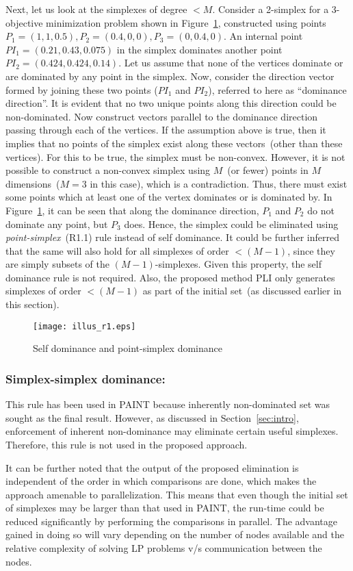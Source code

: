 {	Next, let us look at the simplexes of degree $<M$. Consider a 2-simplex for a 3-objective minimization problem shown in Figure~\ref{fig:illus_r1}, constructed using points $P_1=(1,1,0.5),P_2=(0.4,0,0),P_3=(0,0.4,0)$. An internal point $PI_1=(0.21,0.43,0.075)$ in the simplex dominates another point $PI_2=(0.424,0.424,0.14)$. Let us assume that none of the vertices dominate or are dominated by any point in the simplex. Now, consider the direction vector formed by joining these two points ($PI_1$ and $PI_2$), referred to here as ``dominance direction''. It is evident that no two unique points along this direction could be non-dominated. Now construct vectors parallel to the dominance direction passing through each of the vertices. If the assumption above is true, then it implies that no points of the simplex exist along these vectors~(other than these vertices). For this to be true, the simplex must be non-convex. However, it is not possible to construct a non-convex simplex using $M$~(or fewer) points in $M$ dimensions~($M=3$ in this case), which is a contradiction. Thus, there must exist some points which at least one of the vertex dominates or is dominated by. In Figure~\ref{fig:illus_r1}, it can be seen that along the dominance direction, $P_1$ and $P_2$ do not dominate any point, but $P_3$ does. Hence, the simplex could be eliminated using \textit{point-simplex}~(R1.1) rule instead of self dominance. It could be further inferred that the same will also hold for all simplexes of order $<(M-1)$, since they are simply subsets of the $(M-1)$-simplexes. Given this property, the self dominance rule is not required. Also, the proposed method PLI only generates simplexes of order $<(M-1)$ as part of the initial set~(as discussed earlier in this section).
	
	\begin{figure}[!htb]
		\centering
		\texttt{[image: illus\_r1.eps]} \vspace{1em}
		\caption{Self dominance and point-simplex dominance}
		\label{fig:illus_r1}
	\end{figure}
	
	\subsubsection{Simplex-simplex dominance:}
	
	This rule has been used in PAINT because inherently non-dominated set was sought as the final result. However, as discussed in Section~\ref{sec:intro}, enforcement of inherent non-dominance may eliminate certain useful simplexes. Therefore, this rule is not used in the proposed approach. 
	
	It can be further noted that the output of the proposed elimination is independent of the order in which comparisons are done, which makes the approach amenable to parallelization. This means that even though the initial set of {\color{blue}simplexes} may be larger than that used in PAINT, the run-time could be reduced significantly by performing the comparisons in parallel. The advantage gained in doing so will vary depending on the number of nodes available and the relative complexity of solving LP problems v/s communication between the nodes. 
}
